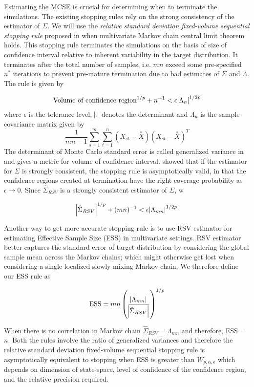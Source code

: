 \documentclass[11pt]{article}
\theoremstyle{remark}
\begin{document}
Estimating the MCSE is crucial for determining when to terminate the simulations. The existing stopping rules rely on the strong consistency of the estimator of $\Sigma$. We will use the \textit{relative standard deviation fixed-volume sequential stopping rule} proposed in \cite{vats2019multivariate} when multivariate Markov chain central limit theorem holds. This stopping rule terminates the simulations on the basis of size of confidence interval relative to inherent variability in the target distribution. It terminates after the total number of samples, i.e. $mn$ exceed some pre-specified $n^*$ iterations to prevent pre-mature termination due to bad estimates of $\Sigma$ and $\Lambda$. The rule is given by

\[
\textrm{Volume of confidence region}^{1/p} + n^{-1} < \epsilon \abs{\Lambda_n}^{1/2p} 
\]
%
where $\epsilon$ is the tolerance level, $\abs{.}$ denotes the determinant and $\Lambda_n$ is the sample covariance matrix given by
%
\[
\dfrac{1}{mn-1}\sum_{s=1}^{m}\sum_{t=1}^{n}(X_{st} - \bar{\bar{X}})(X_{st} - \bar{\bar{X}})^T
\]
%
The determinant of Monte Carlo standard error is called generalized variance in  \cite{wilks1932certain} and gives a metric for volume of confidence interval. \cite{vats2019multivariate} showed that if the estimator for $\Sigma$ is strongly consistent, the stopping rule is asymptotically valid, in that the confidence regions created at termination have the right coverage probability as $\epsilon \to 0$. Since $\hat{\Sigma}_{RSV}$ is a strongly consistent estimator of $\Sigma$, w

\[
\abs{\hat{\Sigma}_{RSV}}^{1/p} + (mn)^{-1} < \epsilon \abs{\Lambda_{mn}}^{1/2p}
\]

Another way to get more accurate stopping rule is to use RSV estimator for estimating Effective Sample Size (ESS) in multivariate settings. RSV estimator better captures the standard error of target distribution by considering the global sample mean across the Markov chains; which might otherwise get lost when considering a single localized slowly mixing Markov chain. We therefore define our ESS rule as

\[
\text{ESS} = mn\left(\dfrac{\abs{\Lambda_{mn}}}{\abs{\hat{\Sigma}_{RSV}}}\right)^{1/p}
\]

When there is no correlation in Markov chain $\hat{\Sigma}_{RSV} = \Lambda_{mn}$ and therefore, ESS = $n$. Both the rules involve the ratio of generalized variances and therefore the relative standard deviation fixed-volume sequential stopping rule is asymptotically equivalent to stopping when ESS is greater than $W_{p,\alpha,\epsilon}$ which depends on dimension of state-space, level of confidence of the confidence region, and the relative precision required. 
\end{document}
